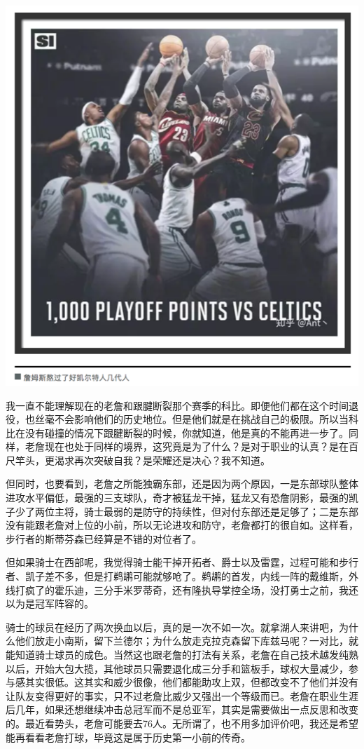 \documentclass[]{book}
\begin{document}
\includegraphics[width=7.75in]{images/nba7}

我一直不能理解现在的老詹和跟腱断裂那个赛季的科比。即便他们都在这个时间退役，也丝毫不会影响他们的历史地位。但是他们就是在挑战自己的极限。所以当科比在没有碰撞的情况下跟腱断裂的时候，你就知道，他是真的不能再进一步了。同样，老詹现在也处于同样的境界，这究竟是为了什么？是对于职业的认真？是在百尺竿头，更渴求再次突破自我？是荣耀还是决心？我不知道。

但同时，也要看到，老詹之所能独霸东部，还是因为两个原因，一是东部球队整体进攻水平偏低，最强的三支球队，奇才被猛龙干掉，猛龙又有恐詹阴影，最强的凯子少了两位主将，骑士最弱的是防守的持续性，但对付东部还是足够了；二是东部没有能跟老詹对上位的小前，所以无论进攻和防守，老詹都打的很自如。这样看，步行者的斯蒂芬森已经算是不错的对位者了。

但如果骑士在西部呢，我觉得骑士能干掉开拓者、爵士以及雷霆，过程可能和步行者、凯子差不多，但是打鹈鹕可能就够呛了。鹈鹕的首发，内线一阵的戴维斯，外线打疯了的霍乐迪，三分手米罗蒂奇，还有隆执导掌控全场，没打勇士之前，我还以为是冠军阵容的。

骑士的球员在经历了两次换血以后，真的是一次不如一次。就拿湖人来讲吧，为什么他们放走小南斯，留下兰德尔；为什么放走克拉克森留下库兹马呢？一对比，就能知道骑士球员的成色。当然这也跟老詹的打法有关系，老詹在自己技术越发纯熟以后，开始大包大揽，其他球员只需要退化成三分手和篮板手，球权大量减少，参与感其实很低。这其实和威少很像，他们都能助攻上双，但都改变不了他们并没有让队友变得更好的事实，只不过老詹比威少又强出一个等级而已。老詹在职业生涯后几年，如果还想继续冲击总冠军而不是总亚军，其实是需要做出一点反思和改变的。最近看势头，老詹可能要去76人。无所谓了，也不用多加评价吧，我还是希望能再看看老詹打球，毕竟这是属于历史第一小前的传奇。
\end{document}
